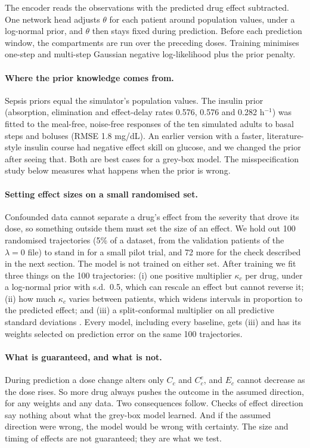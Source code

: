\documentclass[letterpaper]{article}
\begin{document}
The encoder reads the observations with the predicted drug effect subtracted. One network head adjusts $\theta$ for each patient around population values, under a log-normal prior, and $\theta$ then stays fixed during prediction. Before each prediction window, the compartments are run over the preceding doses. Training minimises one-step and multi-step Gaussian negative log-likelihood plus the prior penalty.

\paragraph{Where the prior knowledge comes from.} Sepsis priors equal the simulator's population values. The insulin prior (absorption, elimination and effect-delay rates 0.576, 0.576 and 0.282 h$^{-1}$) was fitted to the meal-free, noise-free responses of the ten simulated adults to basal steps and boluses (RMSE 1.8 mg/dL). An earlier version with a faster, literature-style insulin course had negative effect skill on glucose, and we changed the prior after seeing that. Both are best cases for a grey-box model. The misspecification study below measures what happens when the prior is wrong.

\paragraph{Setting effect sizes on a small randomised set.} Confounded data cannot separate a drug's effect from the severity that drove its dose, so something outside them must set the size of an effect. We hold out 100 randomised trajectories (5\% of a dataset, from the validation patients of the $\lambda=0$ file) to stand in for a small pilot trial, and 72 more for the check described in the next section. The model is not trained on either set. After training we fit three things on the 100 trajectories: (i) one positive multiplier $\kappa_c$ per drug, under a log-normal prior with s.d.\ 0.5, which can rescale an effect but cannot reverse it; (ii) how much $\kappa_c$ varies between patients, which widens intervals in proportion to the predicted effect; and (iii) a split-conformal multiplier on all predictive standard deviations \citep{lei2018conformal}. Every model, including every baseline, gets (iii) and has its weights selected on prediction error on the same 100 trajectories.

\paragraph{What is guaranteed, and what is not.} During prediction a dose change alters only $C_c$ and $C^e_c$, and $E_c$ cannot decrease as the dose rises. So more drug always pushes the outcome in the assumed direction, for any weights and any data. Two consequences follow. Checks of effect direction say nothing about what the grey-box model learned. And if the assumed direction were wrong, the model would be wrong with certainty. The size and timing of effects are not guaranteed; they are what we test.
\end{document}
